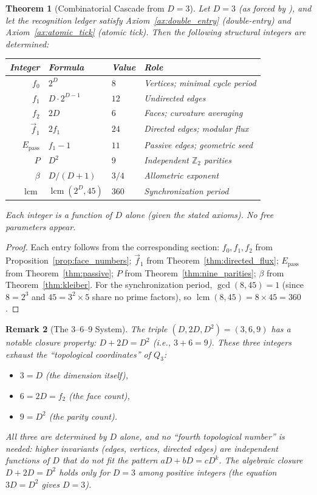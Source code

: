 \documentclass[11pt]{article}
\newtheorem{theorem}{Theorem}[section]
\newtheorem{remark}[theorem]{Remark}
\newcommand{\Z}{\mathbb{Z}}
\newcommand{\lcmop}{\operatorname{lcm}}
\begin{document}
\begin{theorem}[Combinatorial Cascade from $D = 3$]\label{thm:cascade}
Let $D = 3$ (as forced by \cite{PardoGuerraThapa2026}), and let the recognition ledger satisfy Axiom~\ref{ax:double_entry} (double-entry) and Axiom~\ref{ax:atomic_tick} (atomic tick).
Then the following structural integers are determined:
\begin{center}
\begin{tabular}{rlll}
\toprule
\textbf{Integer} & \textbf{Formula} & \textbf{Value} & \textbf{Role} \\
\midrule
$f_0$ & $2^D$ & $8$ & Vertices; minimal cycle period \\
$f_1$ & $D \cdot 2^{D-1}$ & $12$ & Undirected edges \\
$f_2$ & $2D$ & $6$ & Faces; curvature averaging \\
$\vec{f}_1$ & $2 f_1$ & $24$ & Directed edges; modular flux \\
$E_{\mathrm{pass}}$ & $f_1 - 1$ & $11$ & Passive edges; geometric seed \\
$P$ & $D^2$ & $9$ & Independent $\Z_2$ parities \\
$\beta$ & $D/(D+1)$ & $3/4$ & Allometric exponent \\
$\lcmop$ & $\lcmop(2^D, 45)$ & $360$ & Synchronization period \\
\bottomrule
\end{tabular}
\end{center}
Each integer is a function of $D$ alone (given the stated axioms).
No free parameters appear.
\end{theorem}

\begin{proof}
Each entry follows from the corresponding section:
$f_0, f_1, f_2$ from Proposition~\ref{prop:face_numbers};
$\vec{f}_1$ from Theorem~\ref{thm:directed_flux};
$E_{\mathrm{pass}}$ from Theorem~\ref{thm:passive};
$P$ from Theorem~\ref{thm:nine_parities};
$\beta$ from Theorem~\ref{thm:kleiber}.
For the synchronization period, $\gcd(8, 45) = 1$ (since $8 = 2^3$ and $45 = 3^2 \times 5$ share no prime factors), so $\lcmop(8, 45) = 8 \times 45 = 360$.
\end{proof}

\begin{remark}[The 3--6--9 System]\label{rem:369}
The triple $(D, 2D, D^2) = (3, 6, 9)$ has a notable closure property: $D + 2D = D^2$ (i.e., $3 + 6 = 9$).
These three integers exhaust the ``topological coordinates'' of $Q_3$:
\begin{itemize}
  \item $3 = D$ (the dimension itself),
  \item $6 = 2D = f_2$ (the face count),
  \item $9 = D^2$ (the parity count).
\end{itemize}
All three are determined by $D$ alone, and no ``fourth topological number'' is needed: higher invariants (edges, vertices, directed edges) are independent functions of $D$ that do not fit the pattern $aD + bD = cD^k$.
The algebraic closure $D + 2D = D^2$ holds only for $D = 3$ among positive integers (the equation $3D = D^2$ gives $D = 3$).
\end{remark}
\end{document}
